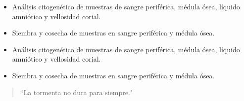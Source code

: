 \documentclass[10pt,a4paper,ragged2e,]{altacv}
\begin{document}
\divider

\begin{itemize}
\item Análisis citogenético de muestras de sangre periférica, médula ósea, líquido amniótico y vellosidad corial.
\item Siembra y cosecha de muestras en sangre periférica y médula ósea.
\end{itemize}

\divider


\begin{itemize}
\item Análisis citogenético de muestras de sangre periférica, médula ósea, líquido amniótico y vellosidad corial.
\item Siembra y cosecha de muestras en sangre periférica y médula ósea.
\end{itemize}





\begin{quote}
``La tormenta no dura para siempre."
\end{quote}



\divider

\end{document}
